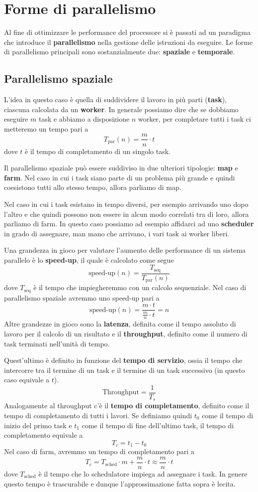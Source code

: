 \chapter{Forme di parallelismo}\label{ch: parallelismo}
Al fine di ottimizzare le performance del processore si è passati ad un paradigma che introduce il
\textbf{parallelismo} nella gestione delle istruzioni da eseguire. Le forme di parallelismo
principali sono sostanzialmente due: \textbf{spaziale} e \textbf{temporale}.

\section{Parallelismo spaziale}
L'idea in questo caso è quella di suddividere il lavoro in più parti (\textbf{task}), ciascuna
calcolata da un \textbf{worker}. In generale possiamo dire che se dobbiamo eseguire $m$ task e
abbiamo a disposizione $n$ worker, per completare tutti i task ci metteremo un tempo pari a
\[ T_\text{par} (n) = \frac{m}{n} \cdot t \]
dove $t$ è il tempo di completamento di un singolo task.

Il parallelismo spaziale può essere suddiviso in due ulteriori tipologie: \textbf{map} e
\textbf{farm}. Nel caso in cui i task siano parte di un problema più grande e quindi coesistono
tutti allo stesso tempo, allora parliamo di map.

Nel caso in cui i task esistano in tempo diversi, per esempio arrivando uno dopo l'altro e che
quindi possono non essere in alcun modo correlati tra di loro, allora parliamo di farm. In questo
caso possiamo ad esempio affidarci ad uno \textbf{scheduler} in grado di assegnare, man mano che
arrivano, i vari task ai worker liberi.

Una grandezza in gioco per valutare l'aumento delle performance di un sistema parallelo è lo
\textbf{speed-up}, il quale è calcolato come segue
\[ \text{speed-up} (n) = \frac{T_\text{seq}}{T_\text{par} (n)} \]
dove $T_\text{seq}$ è il tempo che impiegheremmo con un calcolo sequenziale. Nel caso di
parallelismo spaziale avremmo uno speed-up pari a
\[ \text{speed-up} (n) = \frac{m \cdot t}{\frac{m}{n} \cdot t} = n \]
Altre grandezze in gioco sono la \textbf{latenza}, definita come il tempo assoluto di lavoro per il
calcolo di un risultato e il \textbf{throughput}, definito come il numero di task terminati
nell'unità di tempo.

Quest'ultimo è definito in funzione del \textbf{tempo di servizio}, ossia il tempo che intercorre
tra il termine di un task e il termine di un task successivo (in questo caso equivale a $t$).
\[ \text{Throughput} = \frac{1}{T_s} \]
Analogamente al throughput c'è il \textbf{tempo di completamento}, definito come il tempo di
completamento di tutti i lavori. Se definiamo quindi $t_0$ come il tempo di inizio del primo task
e $t_1$ come il tempo di fine dell'ultimo task, il tempo di completamento equivale a
\[ T_c = t_1 - t_0 \]
Nel caso di farm, avremmo un tempo di completamento pari a
\[ T_c = T_\text{sched} \cdot m + \frac{m}{n} \cdot t \approx \frac{m}{n} \cdot t \]
dove $T_\text{sched}$ è il tempo che lo schedulatore impiega ad assegnare i task. In genere questo
tempo è trascurabile e dunque l'approssimazione fatta sopra è lecita.

